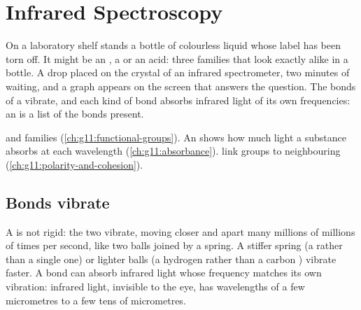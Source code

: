 \chapter{Infrared Spectroscopy}\label{ch:g11:infrared}

On a laboratory shelf stands a bottle of colourless liquid whose label
has been torn off. It might be an , a  or an acid: three
families that look exactly alike in a bottle. A drop placed on the
crystal of an infrared spectrometer, two minutes of waiting, and a graph
appears on the screen that answers the question. The bonds of a 
vibrate, and each kind of bond absorbs infrared light of its own
frequencies: an  is a list of the bonds present.

\begin{recall}
 and families (\cref{ch:g11:functional-groups}). An
 shows how much light a substance absorbs at each
wavelength (\cref{ch:g11:absorbance}).  link 
groups to neighbouring  (\cref{ch:g11:polarity-and-cohesion}).
\end{recall}

\section{Bonds vibrate}

A  is not rigid: the two  vibrate, moving closer and
apart many millions of millions of times per second, like two balls
joined by a spring. A stiffer spring (a  rather than a single
one) or lighter balls (a hydrogen  rather than a carbon ) vibrate
faster. A bond can absorb infrared light whose frequency matches its own
vibration: infrared light, invisible to the eye, has wavelengths of a few
micrometres to a few tens of micrometres.

